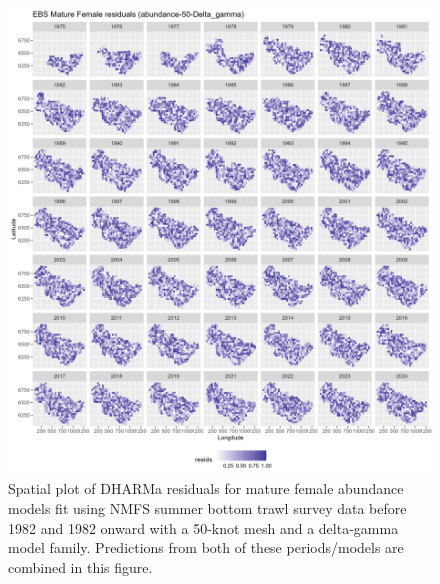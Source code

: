 \documentclass[
]{article}
\begin{document}
\begin{figure}

{\centering \includegraphics[width=1\linewidth,height=1\textheight]{../BAIRDI/Figures/DHARMa_Mature Female_abundance-50-Delta_gamma_SPATIAL} 

}

\caption{Spatial plot of DHARMa residuals for mature female abundance models fit using NMFS summer bottom trawl survey data before 1982 and 1982 onward with a 50-knot mesh and a delta-gamma model family. Predictions from both of these periods/models are combined in this figure.}\label{fig:DHARMa-abund-spat-50-matfem}
\end{figure}
\end{document}
